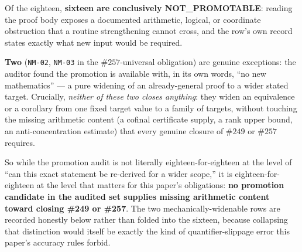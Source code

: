 \documentclass[11pt]{article}
\theoremstyle{plain}
\theoremstyle{definition}
\theoremstyle{remark}
\begin{document}
Of the eighteen, \textbf{sixteen are conclusively NOT\_PROMOTABLE}: reading
the proof body exposes a documented arithmetic, logical, or coordinate
obstruction that a routine strengthening cannot cross, and the row's own
record states exactly what new input would be required.

\textbf{Two}
(\texttt{NM-02}, \texttt{NM-03} in the \(\#257\)-universal obligation) are
genuine exceptions: the auditor found the promotion is available with, in
its own words, ``no new mathematics'' — a pure widening of an already-general
proof to a wider stated target. Crucially, \emph{neither of these two closes
anything}: they widen an equivalence or a corollary from one fixed target
value to a family of targets, without touching the missing arithmetic
content (a cofinal certificate supply, a rank upper bound, an anti-concentration
estimate) that every genuine closure of \(\#249\) or \(\#257\) requires.

So
while the promotion audit is not literally eighteen-for-eighteen at the level
of ``can this exact statement be re-derived for a wider scope,'' it is
eighteen-for-eighteen at the level that matters for this paper's obligations:
\textbf{no promotion candidate in the audited set supplies missing arithmetic
content toward closing \#249 or \#257}. The two mechanically-widenable rows
are recorded honestly below rather than folded into the sixteen, because
collapsing that distinction would itself be exactly the kind of
quantifier-slippage error this paper's accuracy rules forbid.
\end{document}
